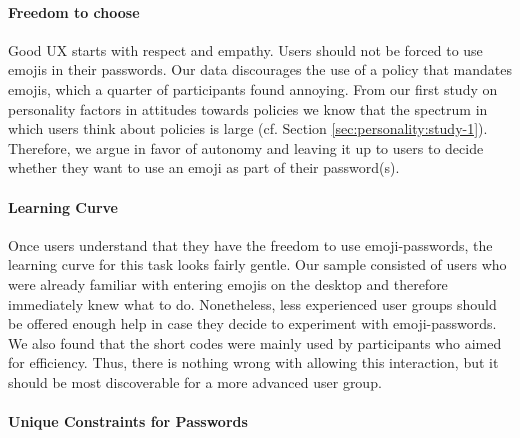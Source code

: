 \paragraph{Freedom to choose} Good UX starts with respect and empathy. Users should not be forced to use emojis in their passwords. Our data discourages the use of a policy that mandates emojis, which a quarter of participants found annoying. From our first study on personality factors in attitudes towards policies we know that the spectrum in which users think about policies is large (cf. Section \ref{sec:personality:study-1}). Therefore, we argue in favor of autonomy and leaving it up to users to decide whether they want to use an emoji as part of their password(s). 

\paragraph{Learning Curve} Once users understand that they have the freedom to use emoji-passwords, the learning curve for this task looks fairly gentle. Our sample consisted of users who were already familiar with entering emojis on the desktop and therefore immediately knew what to do. Nonetheless, less experienced user groups should be offered enough help in case they decide to experiment with emoji-passwords. We also found that the short codes were mainly used by participants who aimed for efficiency. Thus, there is nothing wrong with allowing this interaction, but it should be most discoverable for a more advanced user group. 


\paragraph{Unique Constraints for Passwords}\label{sec:emojipasswords:unique-constraints} 


